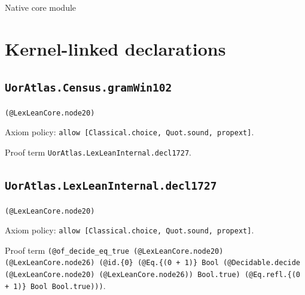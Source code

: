 \documentclass[11pt]{article}
\begin{document}
\begin{center}{\LARGE Native core module}\end{center}
\section*{Kernel-linked declarations}
\subsection*{\texttt{UorAtlas.Census.gramWin102}}
\noindent\texttt{(@LexLeanCore.node20)}\par
\noindent Axiom policy: \texttt{allow [Classical.choice, Quot.sound, propext]}.\par
\noindent Proof term \texttt{UorAtlas.LexLeanInternal.decl1727}.\par
\subsection*{\texttt{UorAtlas.LexLeanInternal.decl1727}}
\noindent\texttt{(@LexLeanCore.node20)}\par
\noindent Axiom policy: \texttt{allow [Classical.choice, Quot.sound, propext]}.\par
\noindent Proof term \texttt{(@of\_decide\_eq\_true (@LexLeanCore.node20) (@LexLeanCore.node26) (@id.\{0\} (@Eq.\{(0 + 1)\} Bool (@Decidable.decide (@LexLeanCore.node20) (@LexLeanCore.node26)) Bool.true) (@Eq.refl.\{(0 + 1)\} Bool Bool.true)))}.\par
\end{document}
